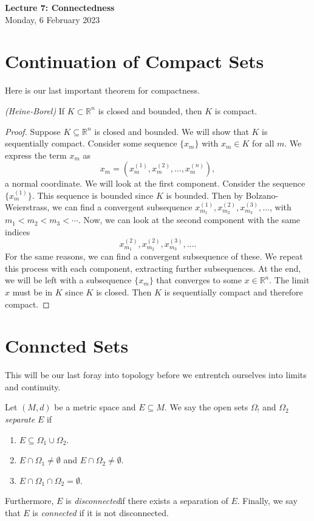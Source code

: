 \documentclass[11pt]{article}
\theoremstyle{definition}
\newcommand{\R}{\mathbb{R}}                      %
\begin{document}
\thispagestyle{empty}

\begin{center}
{\LARGE \bf Lecture 7: Connectedness}\\
{\large Monday, 6 February 2023}\\

\end{center}
\section{Continuation of Compact Sets}
Here is our last important theorem for compactness.

\begin{shaded}
    \theorem \textit{(Heine-Borel)} If $K\subset \R^n$ is closed and bounded, then $K$ is compact.
\end{shaded}
 \begin{proof}
     Suppose $K\subseteq \R^n$ is closed and bounded. We will show that $K$ is sequentially compact. Consider some sequence $\{x_m\}$ with $x_m\in K$ for all $m$. We express the term $x_m$ as
     $$
     x_m=(x_m^{(1)},x_m^{(2)},\dots,x_m^{(n)}),
     $$
     a normal coordinate. We will look at the first component. Consider the sequence $\{x_m^(1)\}$. This sequence is bounded since $K$ is bounded. Then by Bolzano-Weierstrass, we can find a convergent subsequence $x_{m_1}^{(1)},x_{m_2}^{(2)},x_{m_3}^{(3)},\dots$, with $m_1<m_2<m_3<\cdots$. Now, we can look at the second component with the same indices 
     $$
     x_{m_1}^{(2)},x_{m_2}^{(2)},x_{m_3}^{(3)},\dots.
     $$
     For the same reasons, we can find a convergent subsequence of these. We repeat this process with each component, extracting further subsequences. At the end, we will be left with a subsequence $\{x_m\}$ that converges to some $x\in \R^n$. The limit $x$ must be in $K$ since $K$ is closed. Then $K$ is sequentially compact and therefore compact.
     \end{proof}

\section{Conncted Sets}
This will be our last foray into topology before we entrentch ourselves into limits and continuity. 

\begin{mdframed}[backgroundcolor = blue!10]
\vspace{+0.2cm}
 Let $(M,d)$ be a metric space and $E\subseteq M$. We say the open sets $\Omega_!$ and $\Omega_2$ \textit{separate} $E$ if
\begin{enumerate}
    \item $E\subseteq\Omega_1\cup \Omega_2$.
    \item $E\cap \Omega_1 \neq \emptyset$ and $E\cap \Omega_2\neq\emptyset$.
    \item $E\cap\Omega_1\cap\Omega_2=\emptyset$.
\end{enumerate}
Furthermore, $E$ is \textit{disconnected}if there exists a separation of $E$. Finally, we say that $E$ is \textit{connected} if it is not disconnected.
\end{mdframed}
\end{document}
